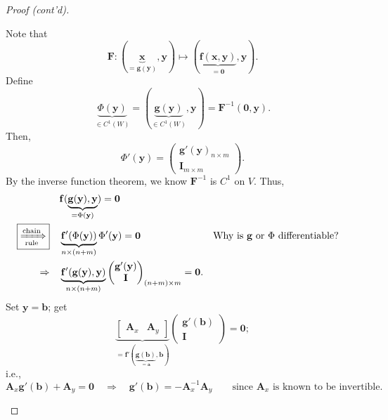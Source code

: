 \documentclass[letterpaper, reqno,11pt]{article}
\begin{document}
\begin{proof}[Proof (cont'd)]
\begin{enumerate}
    Note that
    \[ \mathbf F : (\underbrace{\mathbf x}_{= \mathbf g(\mathbf y)}, \mathbf y) \mapsto (\underbrace{\mathbf f(\mathbf x, \mathbf y)}_{= \mathbf 0}, \mathbf y). \]
    Define
    \[ \underbrace{\Phi(\mathbf y)}_{\in C^1(W)} = (\underbrace{\mathbf g(\mathbf y)}_{\in C^1(W)}, \mathbf y) = \mathbf F^{-1}(\mathbf 0, \mathbf y). \]
    Then,
    \[ \Phi'(\mathbf y) =
    \begin{pmatrix}
      \mathbf g'(\mathbf y)_{n \times m} \\
      \mathbf I_{m \times m}
    \end{pmatrix}
    . \]
    By the inverse function theorem, we know $\mathbf F^{-1}$ is $C^1$ on $V$. Thus,
    \begin{align*}
      & \mathbf f(\underbrace{\mathbf g(\mathbf y), \mathbf y}_{= \Phi(\mathbf y)}) = \mathbf 0 \\
      \boxed{\xRightarrow[\text{rule}]{\text{chain}}} \quad & \underbrace{\mathbf f'(\Phi(\mathbf y))}_{n \times (n + m)} \Phi'(\mathbf y) = \mathbf 0 && \text{Why is $\mathbf g$ or $\Phi$ differentiable?} \\
      \Rightarrow \quad & \underbrace{\mathbf f'(\mathbf g(\mathbf y), \mathbf y)}_{n \times (n + m)}
      \begin{pmatrix}
        \mathbf g'(\mathbf y) \\
        \mathbf I
      \end{pmatrix}
      _{(n + m) \times m} = \mathbf 0.
    \end{align*}
    Set $\mathbf y = \mathbf b$; get
    \[ \underbrace{
      \begin{bmatrix}
        \mathbf A_x & \mathbf A_y
      \end{bmatrix}
    }_{= \mathbf f'(\underbrace{\mathbf g(\mathbf b)}_{= \mathbf a}, \mathbf b)}
    \begin{pmatrix}
      \mathbf g'(\mathbf b) \\
      \mathbf I
    \end{pmatrix}
    = \mathbf 0; \]
    i.e.,
    \[ \mathbf A_x \mathbf g'(\mathbf b) + \mathbf A_y = \mathbf 0 \quad \Rightarrow \quad \mathbf g'(\mathbf b) = -\mathbf A_x^{-1} \mathbf A_y \qquad \text{since $\mathbf A_x$ is known to be invertible}. \]
  \end{enumerate}
\end{proof}
\end{document}
